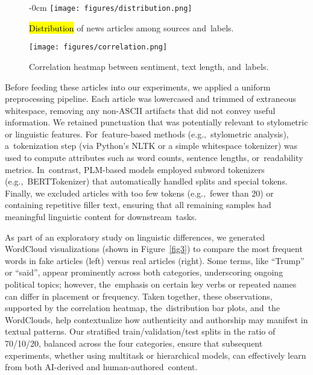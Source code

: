 \documentclass[electronics,article,accept,pdftex,moreauthors,electronics]{Definitions/mdpi}
\begin{document}
\begin{figure}[H] %
\begin{adjustwidth}{-\extralength}{0cm}
\centering
    \texttt{[image: figures/distribution.png]}
\end{adjustwidth}
    \caption{\hl{Distribution} %
 of news articles among sources and~labels.}
    \label{fig1}
\end{figure}
\unskip


\begin{figure}[H]
    \texttt{[image: figures/correlation.png]}
    \caption{Correlation heatmap between sentiment, text length, and~labels.}
    \label{fig2}
\end{figure}


Before feeding these articles into our experiments, we applied a uniform preprocessing pipeline. Each article was lowercased and trimmed of extraneous whitespace, removing any non-ASCII artifacts that did not convey useful information. We retained punctuation that was potentially relevant to stylometric or linguistic features. For~feature-based methods (e.g.,~stylometric analysis), a~tokenization step (via Python’s NLTK or a simple whitespace tokenizer) was used to compute attributes such as word counts, sentence lengths, or~readability metrics. In~contrast, PLM-based models employed subword tokenizers (e.g.,~BERTTokenizer) that automatically handled splits and special tokens. Finally, we excluded articles with too few tokens (e.g.,~fewer than 20) or containing repetitive filler text, ensuring that all remaining samples had meaningful linguistic content for downstream~tasks.



As part of an exploratory study on linguistic differences, we generated WordCloud visualizations (shown in Figure~\ref{fig3}) to compare the most frequent words in fake articles (left) versus real articles (right). Some terms, like “Trump” or “said”, appear prominently across both categories, underscoring ongoing political topics; however, the~emphasis on certain key verbs or repeated names can differ in placement or frequency. Taken together, these observations, supported by the correlation heatmap, the~distribution bar plots, and~the WordClouds, help contextualize how authenticity and authorship may manifest in textual patterns. Our stratified train/validation/test splits in the ratio of 70/10/20, balanced across the four categories, ensure that subsequent experiments, whether using multitask or hierarchical models, can effectively learn from both AI-derived and human-authored~content.
\end{document}
